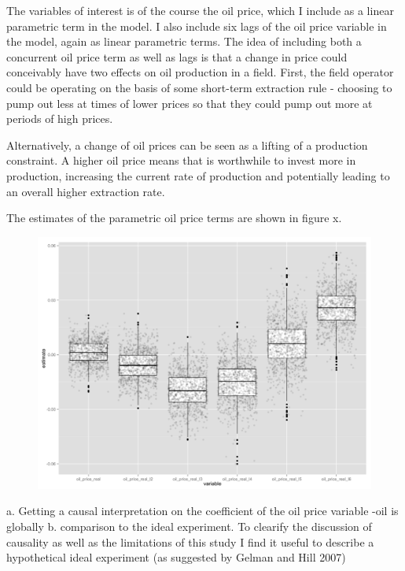 \documentclass[12pt]{scrartcl} %
\begin{document}
The variables of interest is of the course the oil price, which I include as a linear parametric term in the model.  I also include six lags of the oil price variable in the model, again as linear parametric terms.  The idea of including both a concurrent oil price term as well as lags is that a change in price could conceivably have two effects on oil production in a field.  First, the field operator could be operating on the basis of some short-term extraction rule - choosing to pump out less at times of lower prices so that they could pump out more at periods of high prices.  

Alternatively, a change of oil prices can be seen as a lifting of a production constraint.  A higher oil price means that is worthwhile to invest more in production, increasing the current rate of production and potentially leading to an overall higher extraction rate.  

The estimates of the parametric oil price terms are shown in figure x.

\begin{figure}
	\includegraphics[width=1\textwidth]{gam_price_under_dirty_box.png}
\end{figure}




	a. Getting a causal interpretation on the coefficient of the oil price variable
		-oil is globally 
	b. comparison to the ideal experiment.  
	To clearify the discussion of causality as well as the limitations of this study I find it useful to describe a hypothetical ideal experiment (as suggested by Gelman and Hill 2007)








\end{document}
